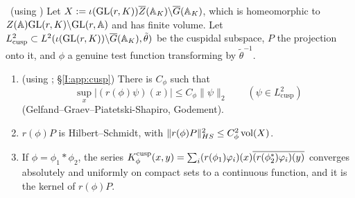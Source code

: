 \begin{lemma}\label{I:lem:A1}\ (using \Ev)
Let $X:=\iota(\mathrm{GL}(r,K))\overline{Z}(\mathbb{A}_K)\backslash\overline{G}(\mathbb{A}_K)$, which is homeomorphic to $Z(\mathbb{A})\mathrm{GL}(r,K)\backslash\mathrm{GL}(r,\mathbb{A})$ and has finite volume. Let $L^2_{\mathrm{cusp}}\subset L^2(\iota(\mathrm{GL}(r,K))\backslash\overline{G}(\mathbb{A}_K),\tilde\theta)$ be the cuspidal subspace, $P$ the projection onto it, and $\phi$ a genuine test function transforming by $\tilde\theta^{-1}$.
\begin{enumerate}[label=(\alph*)]
\item (using \Ev; \S\ref{I:app:cusp}) There is $C_\phi$ such that
\[ \sup_{x}|(r(\phi)\psi)(x)|\le C_\phi\|\psi\|_2\qquad(\psi\in L^2_{\mathrm{cusp}}) \]
(Gelfand--Graev--Piatetski-Shapiro, Godement).
\item $r(\phi)P$ is Hilbert--Schmidt, with $\|r(\phi)P\|_{HS}^2\le C_\phi^2\operatorname{vol}(X)$.
\item If $\phi=\phi_1*\phi_2$, the series $K^{\mathrm{cusp}}_\phi(x,y)=\sum_i(r(\phi_1)\varphi_i)(x)\overline{(r(\phi_2^*)\varphi_i)(y)}$ converges absolutely and uniformly on compact sets to a continuous function, and it is the kernel of $r(\phi)P$.
\end{enumerate}
\end{lemma}
